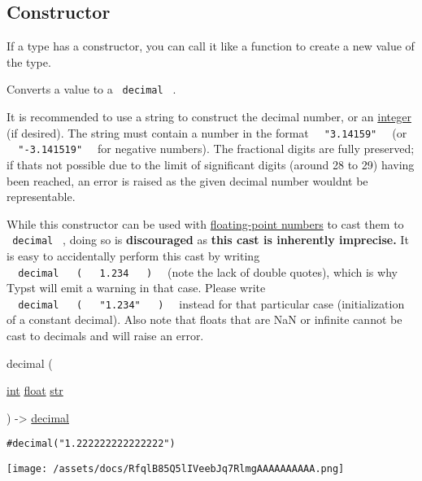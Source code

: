 \subsection{\texorpdfstring{Constructor
{}}{Constructor }}\label{constructor}

\label{constructor-constructor-tooltip}
If a type has a constructor, you can call it like a function to create a
new value of the type.

Converts a value to a \texttt{\ decimal\ } .

It is recommended to use a string to construct the decimal number, or an
\href{/docs/reference/foundations/int/}{integer} (if desired). The
string must contain a number in the format
\texttt{\ }{\texttt{\ "3.14159"\ }}\texttt{\ } (or
\texttt{\ }{\texttt{\ "-3.141519"\ }}\texttt{\ } for negative numbers).
The fractional digits are fully preserved; if that\textquotesingle s not
possible due to the limit of significant digits (around 28 to 29) having
been reached, an error is raised as the given decimal number
wouldn\textquotesingle t be representable.

While this constructor can be used with
\href{/docs/reference/foundations/float/}{floating-point numbers} to
cast them to \texttt{\ decimal\ } , doing so is \textbf{discouraged} as
\textbf{this cast is inherently imprecise.} It is easy to accidentally
perform this cast by writing
\texttt{\ }{\texttt{\ decimal\ }}\texttt{\ }{\texttt{\ (\ }}\texttt{\ }{\texttt{\ 1.234\ }}\texttt{\ }{\texttt{\ )\ }}\texttt{\ }
(note the lack of double quotes), which is why Typst will emit a warning
in that case. Please write
\texttt{\ }{\texttt{\ decimal\ }}\texttt{\ }{\texttt{\ (\ }}\texttt{\ }{\texttt{\ "1.234"\ }}\texttt{\ }{\texttt{\ )\ }}\texttt{\ }
instead for that particular case (initialization of a constant decimal).
Also note that floats that are NaN or infinite cannot be cast to
decimals and will raise an error.

{ decimal } (

{ \href{/docs/reference/foundations/int/}{int}
\href{/docs/reference/foundations/float/}{float}
\href{/docs/reference/foundations/str/}{str} }

) -\textgreater{} \href{/docs/reference/foundations/decimal/}{decimal}

\begin{verbatim}
#decimal("1.222222222222222")
\end{verbatim}

\texttt{[image: /assets/docs/RfqlB85Q5lIVeebJq7RlmgAAAAAAAAAA.png]}

